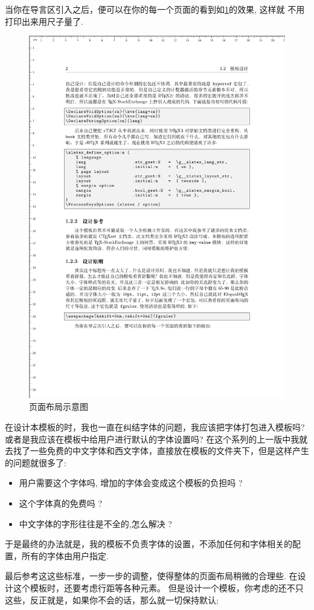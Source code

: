 \documentclass[
    lang=cn, 
    layout=oneside, 
    margin=false, 
    math-alias=true,
    toc={rename, 2column},
]{zlatex}
\begin{document}
当你在导言区引入之后，便可以在你的每一个页面的看到如\cref{fig:fgruler-example}的效果, 这样就 
不用打印出来用尺子量了.

\begin{figure}[!htb]
    \centering
    \includegraphics[width=.75\linewidth]{./pics/fgruler_example.pdf}
    \caption{页面布局示意图}
    \label{fig:fgruler-example}
\end{figure}

在设计本模板的时，我也一直在纠结字体的问题，我应该把字体打包进入模板吗? 或者是我应该在模板中给用户进行默认的字体设置吗?
在这个系列的上一版中我就去找了一些免费的中文字体和西文字体，直接放在模板的文件夹下，但是这样产生的问题就很多了:

\begin{itemize}
    \item 用户需要这个字体吗, 增加的字体会变成这个模板的负担吗 ?
    \item 这个字体真的免费吗 ?
    \item 中文字体的字形往往是不全的,怎么解决 ? 
\end{itemize}

于是最终的办法就是，我的模板不负责字体的设置，不添加任何和字体相关的配置，所有的字体由用户指定. 


最后参考这这些标准，一步一步的调整，使得整体的页面布局稍微的合理些. 在设计这个模板时，还要考虑行距等各种元素。
但是设计一个模板，你考虑的还不只这些，反正就是，如果你不会的话，那么就一切保持默认; 
\end{document}
